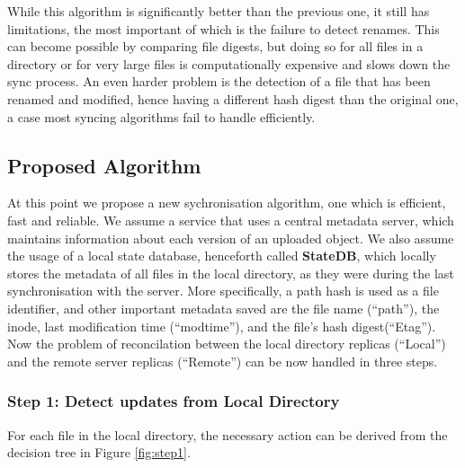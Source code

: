     While this algorithm is significantly better than the previous one, it still has limitations, the most important of which is the failure to detect renames. This can become possible by comparing file digests, but doing so for all files in a directory or for very large files is computationally expensive and slows down the sync process. An even harder problem is the detection of a file that has been renamed and modified, hence having a different hash digest than the original one, a case most syncing algorithms fail to handle efficiently.\\

  \subsection{Proposed Algorithm}
    At this point we propose a new sychronisation algorithm, one which is efficient, fast and reliable. We assume a service that uses a central metadata server, which maintains information about each version of an uploaded object. We also assume the usage of a local state database, henceforth called \textbf{StateDB}, which locally stores the metadata of all files in the local directory, as they were during the last synchronisation with the server. More specifically, a path hash is used as a file identifier, and other important metadata saved are the file name (``path''), the inode, last modification time (``modtime''), and the file's hash digest(``Etag''). Now the problem of reconcilation between the local directory replicas (``Local'') and the remote server replicas (``Remote'') can be now handled in three steps.

    \subsubsection{Step 1: Detect updates from Local Directory}
    For each file in the local directory, the necessary action can be derived from the decision tree in Figure \ref{fig:step1}.

